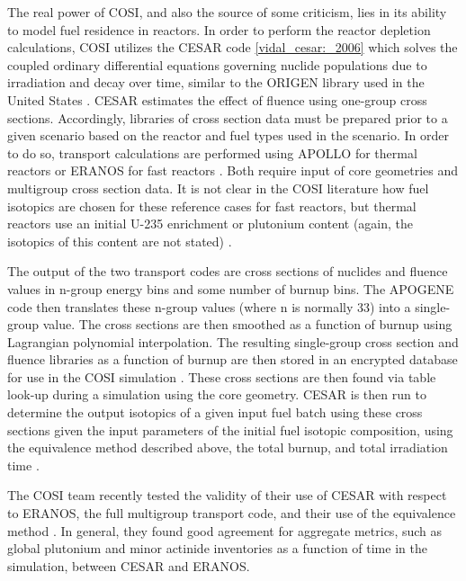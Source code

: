The real power of COSI, and also the source of some criticism, lies in its
ability to model fuel residence in reactors. In order to perform the reactor
depletion calculations, COSI utilizes the CESAR code \ref{vidal_cesar:_2006}
which solves the coupled ordinary differential equations governing nuclide
populations due to irradiation and decay over time, similar to the ORIGEN
library used in the United States \cite{bell_origen_1973}. CESAR estimates the
effect of fluence using one-group cross sections. Accordingly, libraries of
cross section data must be prepared prior to a given scenario based on the
reactor and fuel types used in the scenario. In order to do so, transport
calculations are performed using APOLLO \cite{santamarina_2009_apollo2} for
thermal reactors or ERANOS for fast reactors \cite{ruggieri_2006_eranos}. Both
require input of core geometries and multigroup cross section data. It is not
clear in the COSI literature how fuel isotopics are chosen for these reference
cases for fast reactors, but thermal reactors use an initial U-235 enrichment or
plutonium content (again, the isotopics of this content are not
stated) \cite{guerin_benchmark_2009}.

The output of the two transport codes are cross sections of nuclides and fluence
values in n-group energy bins and some number of burnup bins. The APOGENE code
then translates these n-group values (where n is normally 33) into a
single-group value. The cross sections are then smoothed as a function of burnup
using Lagrangian polynomial interpolation. The resulting single-group cross
section and fluence libraries as a function of burnup are then stored in an
encrypted database for use in the COSI
simulation \cite{atabekjana_2012_analysis}. These cross sections are then found
via table look-up during a simulation using the core geometry. CESAR is then run
to determine the output isotopics of a given input fuel batch using these cross
sections given the input parameters of the initial fuel isotopic composition,
using the equivalence method described above, the total burnup, and total
irradiation time \cite{coquelet-pascal_validation_2011}. 

The COSI team recently tested the validity of their use of CESAR with respect to
ERANOS, the full multigroup transport code, and their use of the equivalence
method \cite{coquelet-pascal_validation_2011}. In general, they found good
agreement for aggregate metrics, such as global plutonium and minor actinide
inventories as a function of time in the simulation, between CESAR and ERANOS. 
